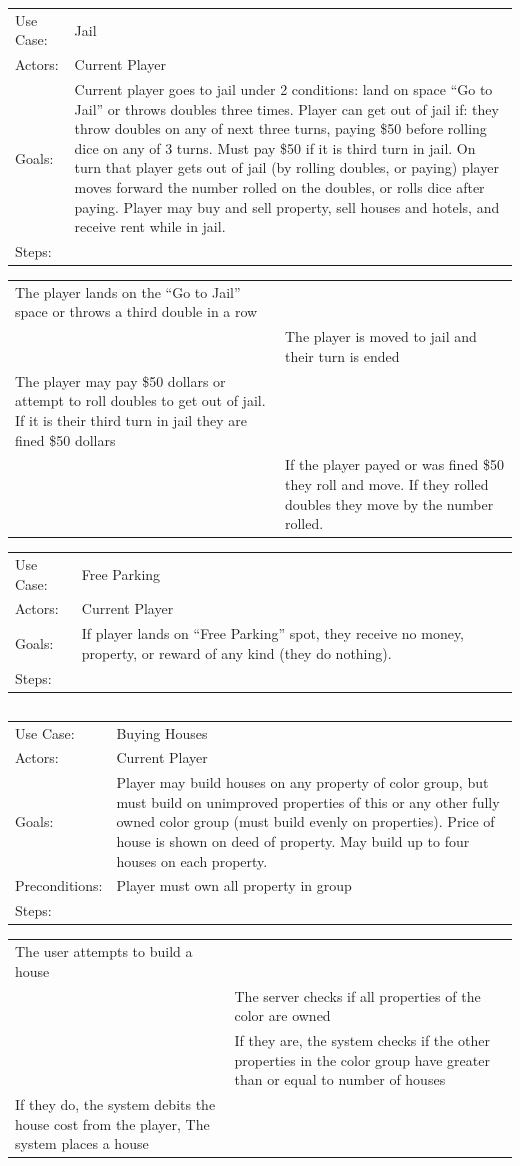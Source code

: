 \documentclass[10pt,letterpaper]{article}
\newcommand{\usecasetwocol}[1]{
\begin{center}
	\begin{tabularx}{0.8\textwidth}{| X X |}
		\hline
		#1 \\
		\hline
	\end{tabularx}
\end{center}
}
\newcommand{\usecasedescription}[1]{
\begin{center}
	\begin{tabularx}{0.8\textwidth}{l X}
		#1
	\end{tabularx}
\end{center}
}
\newcommand{\usecase}[2]{
\usecasedescription{#1}
\usecasetwocol{#2}
}
\begin{document}
\usecase{Use Case: & Jail \\
	Actors: & Current Player \\
	Goals: & Current player goes to jail under 2 conditions: land on space “Go to Jail” or throws doubles three times. Player can get out of jail if: they throw doubles on any of next three  turns, paying \$50 before rolling dice on any of 3 turns. Must pay \$50 if it is third turn in  jail. On turn that player gets out of jail (by rolling doubles, or paying) player moves  forward the number rolled on the doubles, or rolls dice after paying. Player may buy and  sell property, sell houses and hotels, and receive rent while in jail. \\
	Steps: &  }{The player lands on the “Go to Jail” space or throws a third double in a row& \\
	&The player is moved to jail and their turn is ended \\
	The player may pay \$50 dollars or attempt to roll doubles to get out of jail. If it is their third turn in jail they are fined \$50 dollars &\\
	&If the player payed or was fined \$50 they roll and move. If they rolled doubles they move by the number rolled.}

\usecase{Use Case: & Free Parking \\
	Actors: & Current Player \\
	Goals: & If player lands on “Free Parking” spot, they receive no money, property, or reward of any kind (they do nothing). \\
	Steps: &  }{&}

\usecase{Use Case: & Buying Houses \\
	Actors: & Current Player \\
	Goals: & Player may build houses on any property of color group, but must build on unimproved  properties of this or any other fully owned color group (must build evenly on properties). Price of house is shown on deed of property. May build up to four houses on each property. \\
	Preconditions: & Player must own all property in group \\
	Steps: &  }{The user attempts to build a house &\\
	&The server checks if all properties of the color are owned \\
	&If they are, the system checks if the other properties in the color group have greater than or equal to number of houses \\
	If they do, the system debits the house cost from the player, The system places a house&}
\end{document}
